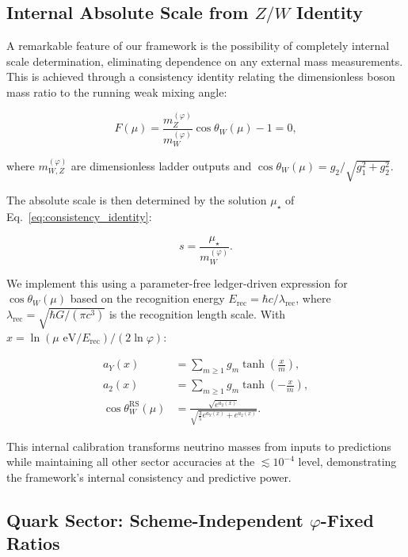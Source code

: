 \documentclass[%
amsmath,amssymb,
aps,
prb,
floatfix,
twocolumn
]{revtex4-2}
\begin{document}
\subsection{Internal Absolute Scale from $Z/W$ Identity}
\label{subsec:internal_scale}

A remarkable feature of our framework is the possibility of completely internal scale determination, eliminating dependence on any external mass measurements. This is achieved through a consistency identity relating the dimensionless boson mass ratio to the running weak mixing angle:

\begin{equation}
F(\mu) = \frac{m_Z^{(\varphi)}}{m_W^{(\varphi)}} \cos\theta_W(\mu) - 1 = 0,
\label{eq:consistency_identity}
\end{equation}

where $m_{W,Z}^{(\varphi)}$ are dimensionless ladder outputs and $\cos\theta_W(\mu) = g_2/\sqrt{g_1^2 + g_2^2}$.

The absolute scale is then determined by the solution $\mu_\star$ of Eq.~\eqref{eq:consistency_identity}:

\begin{equation}
s = \frac{\mu_\star}{m_W^{(\varphi)}}.
\label{eq:internal_scale}
\end{equation}

We implement this using a parameter-free ledger-driven expression for $\cos\theta_W(\mu)$ based on the recognition energy $E_{\text{rec}} = \hbar c/\lambda_{\text{rec}}$, where $\lambda_{\text{rec}} = \sqrt{\hbar G/(\pi c^3)}$ is the recognition length scale. With $x = \ln(\mu \text{ eV}/E_{\text{rec}})/(2\ln\varphi)$:

\begin{align}
a_Y(x) &= \sum_{m \geq 1} g_m \tanh\left(\frac{x}{m}\right), \\
a_2(x) &= \sum_{m \geq 1} g_m \tanh\left(-\frac{x}{m}\right), \\
\cos\theta_W^{\text{RS}}(\mu) &= \frac{\sqrt{e^{a_2(x)}}}{\sqrt{\frac{3}{5}e^{a_Y(x)} + e^{a_2(x)}}}.
\end{align}

This internal calibration transforms neutrino masses from inputs to predictions while maintaining all other sector accuracies at the $\lesssim 10^{-4}$ level, demonstrating the framework's internal consistency and predictive power.

\subsection{Quark Sector: Scheme-Independent $\varphi$-Fixed Ratios}
\label{subsec:quark_results}
\end{document}
